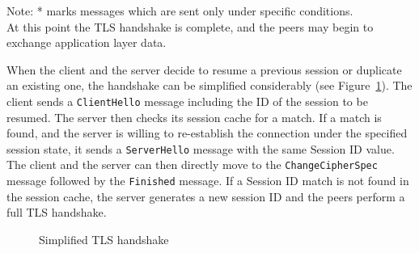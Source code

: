     Note: * marks messages which are sent only under specific conditions. \\

    At this point the TLS handshake is complete, and the peers may begin to
    exchange application layer data.

    When the client and the server decide to resume a previous session or duplicate
    an existing one, the handshake can be simplified considerably
    (see Figure~\ref{fig:simplied_tls_handshake}). The client
    sends a \texttt{ClientHello} message including the ID of the session to be
    resumed. The server then checks its session cache for a match. If a match
    is found, and the server is willing to re-establish the connection under
    the specified session state, it sends a \texttt{ServerHello} message with
    the same Session ID value. The client and the server can then directly move
    to the \texttt{ChangeCipherSpec} message followed by the \texttt{Finished}
    message. If a Session ID match is not found in the session cache, the
    server generates a new session ID and the peers perform a full TLS handshake.

    \begin{figure}[H]
    \centering
    \caption{Simplified TLS handshake} \label{fig:simplied_tls_handshake}
    \end{figure}

